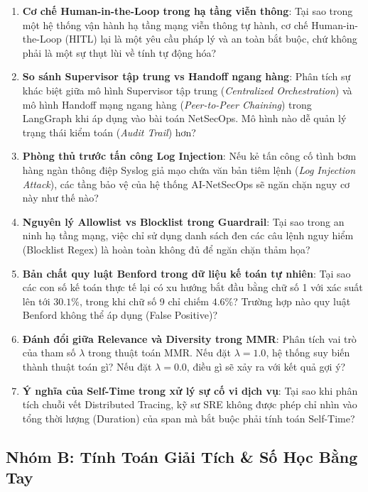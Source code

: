 \begin{enumerate}[label=\textbf{A\arabic*.}]
  \item \textbf{Cơ chế Human-in-the-Loop trong hạ tầng viễn thông}: Tại sao trong một hệ thống vận hành hạ tầng mạng viễn thông tự hành, cơ chế Human-in-the-Loop (HITL) lại là một yêu cầu pháp lý và an toàn bắt buộc, chứ không phải là một sự thụt lùi về tính tự động hóa?
  \item \textbf{So sánh Supervisor tập trung vs Handoff ngang hàng}: Phân tích sự khác biệt giữa mô hình Supervisor tập trung (\textit{Centralized Orchestration}) và mô hình Handoff mạng ngang hàng (\textit{Peer-to-Peer Chaining}) trong LangGraph khi áp dụng vào bài toán NetSecOps. Mô hình nào dễ quản lý trạng thái kiểm toán (\textit{Audit Trail}) hơn?
  \item \textbf{Phòng thủ trước tấn công Log Injection}: Nếu kẻ tấn công cố tình bơm hàng ngàn thông điệp Syslog giả mạo chứa văn bản tiêm lệnh (\textit{Log Injection Attack}), các tầng bảo vệ của hệ thống AI-NetSecOps sẽ ngăn chặn nguy cơ này như thế nào?
  \item \textbf{Nguyên lý Allowlist vs Blocklist trong Guardrail}: Tại sao trong an ninh hạ tầng mạng, việc chỉ sử dụng danh sách đen các câu lệnh nguy hiểm (Blocklist Regex) là hoàn toàn không đủ để ngăn chặn thảm họa?
  \item \textbf{Bản chất quy luật Benford trong dữ liệu kế toán tự nhiên}: Tại sao các con số kế toán thực tế lại có xu hướng bắt đầu bằng chữ số 1 với xác suất lên tới $30.1\%$, trong khi chữ số 9 chỉ chiếm $4.6\%$? Trường hợp nào quy luật Benford không thể áp dụng (False Positive)?
  \item \textbf{Đánh đổi giữa Relevance và Diversity trong MMR}: Phân tích vai trò của tham số $\lambda$ trong thuật toán MMR. Nếu đặt $\lambda = 1.0$, hệ thống suy biến thành thuật toán gì? Nếu đặt $\lambda = 0.0$, điều gì sẽ xảy ra với kết quả gợi ý?
  \item \textbf{Ý nghĩa của Self-Time trong xử lý sự cố vi dịch vụ}: Tại sao khi phân tích chuỗi vết Distributed Tracing, kỹ sư SRE không được phép chỉ nhìn vào tổng thời lượng (Duration) của span mà bắt buộc phải tính toán Self-Time?
\end{enumerate}

\subsection{Nhóm B: Tính Toán Giải Tích \& Số Học Bằng Tay}

